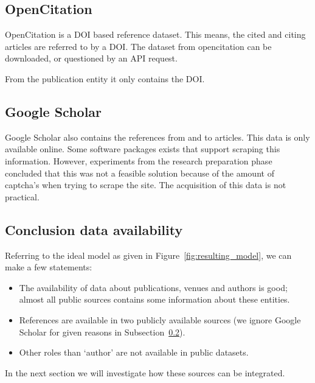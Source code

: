 \documentclass{ou-report}
\newcommand{\doi}{{DOI}}
\newcommand{\api}{API}
\begin{document}
\subsection{OpenCitation} 
OpenCitation is a \doi{} based reference dataset. This means, the cited and citing 
articles are referred to by a \doi{}. 
The dataset from opencitation can be downloaded, or questioned by an \api{} request. 

From the publication entity it only contains the \doi{}.


\subsection{Google Scholar}
\label{subsec:google_scholar}
Google Scholar also contains the references from and to articles. This data is 
only available online. Some software packages exists that support scraping this
information. However, experiments from the research preparation phase concluded
that this was not a feasible solution because of the amount of captcha's when
trying to scrape the site. The acquisition of this data is not practical.

\subsection{Conclusion data availability}
\label{subsec:ConclusionsDataAvailablity}
Referring to the ideal model as given in Figure~\ref{fig:resulting_model}, we 
can make a few statements:
\begin{itemize}
    \item The availability of data about publications, venues and authors is 
    good; almost all public sources contains some information about these 
    entities. 
    \item References are available in two publicly available sources (we ignore 
    Google Scholar for given reasons in Subsection~\ref{subsec:google_scholar}).
    \item Other roles than `author' are not available in public datasets.
\end{itemize}

In the next section we will investigate how these sources can be integrated.

\end{document}
